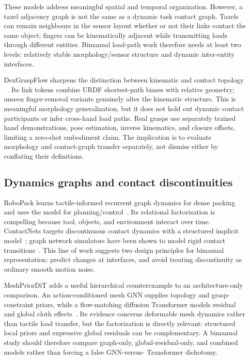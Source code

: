 These models address meaningful spatial and temporal organization. However, a
taxel adjacency graph is not the same as a dynamic task contact graph. Taxels can
remain neighbours in the sensor layout whether or not their links contact the
same object; fingers can be kinematically adjacent while transmitting loads
through different entities. Bimanual load-path work therefore needs at least two
levels: relatively stable morphology/sensor structure and dynamic inter-entity
interfaces.

DexGraspFlow sharpens the distinction between kinematic and contact topology
~\cite{update2026dexgraspflow}. Its link tokens combine URDF shortest-path biases
with relative geometry; unseen finger-removal variants genuinely alter the
kinematic structure. This is meaningful morphology generalization, but it does
not hold out dynamic contact participants or infer cross-hand load paths.
Real grasps use separately trained hand demonstrations, pose estimation,
inverse kinematics, and closure offsets, limiting a zero-shot embodiment claim.
The implication is to evaluate morphology and contact-graph transfer separately,
not dismiss either by conflating their definitions.

\subsection{Dynamics graphs and contact discontinuities}

RoboPack learns tactile-informed recurrent graph dynamics for dense packing and
uses the model for planning/control~\cite{ai2024robopack}. Its relational
factorization is compelling because tool, objects, and environment interact over
time. ContactNets targets discontinuous contact dynamics with a structured
implicit model~\cite{pfrommer2020contactnets}; graph network simulators have been
shown to model rigid contact transitions~\cite{allen2022contact}. This line of
work suggests two design principles for bimanual representation: predict changes
at interfaces, and avoid treating discontinuity as ordinary smooth motion noise.

MeshPriorDiT adds a useful hierarchical counterexample to an architecture-only
comparison. An action-conditioned mesh GNN supplies topology and grasp-constraint
priors, while a flow-matching diffusion Transformer models residual and global
cloth effects~\cite{wang2026meshpriordit}. Its evidence concerns deformable mesh
dynamics rather than tactile load transfer, but the factorization is directly
relevant: structured local priors and expressive global residuals can be
complementary. A bimanual study should therefore compare graph-only,
global-residual-only, and combined models rather than forcing a false GNN-versus-
Transformer dichotomy.

